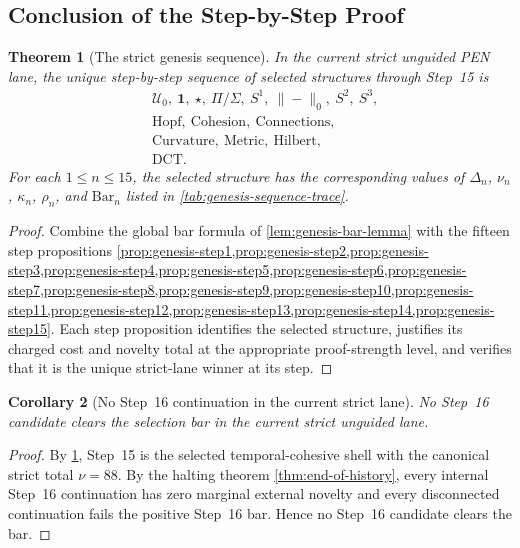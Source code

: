\documentclass[11pt,a4paper]{article}
\theoremstyle{plain}
\newtheorem{theorem}{Theorem}[section]
\newtheorem{corollary}[theorem]{Corollary}
\theoremstyle{definition}
\theoremstyle{remark}
\newcommand{\U}{\mathcal{U}}
\begin{document}
\subsection{Conclusion of the Step-by-Step Proof}
\label{subsec:genesis-proof-conclusion}

\begin{theorem}[The strict genesis sequence]
\label{thm:strict-genesis-sequence}
In the current strict unguided PEN lane, the unique step-by-step sequence of
selected structures through Step~15 is
\[
  \begin{aligned}
    &\U_0,\ \mathbf{1},\ \star,\ \Pi/\Sigma,\ S^1,\ \|{-}\|_0,\ S^2,\ S^3,\\
    &\mathrm{Hopf},\ \mathrm{Cohesion},\ \mathrm{Connections},\\
    &\mathrm{Curvature},\ \mathrm{Metric},\ \mathrm{Hilbert},\\
    &\mathrm{DCT}.
  \end{aligned}
\]
For each $1\le n\le 15$, the selected structure has the corresponding values of
$\Delta_n$, $\nu_n$, $\kappa_n$, $\rho_n$, and $\mathrm{Bar}_n$ listed in
\cref{tab:genesis-sequence-trace}.
\end{theorem}

\begin{proof}
Combine the global bar formula of \cref{lem:genesis-bar-lemma} with the fifteen
step propositions
\cref{prop:genesis-step1,prop:genesis-step2,prop:genesis-step3,prop:genesis-step4,prop:genesis-step5,prop:genesis-step6,prop:genesis-step7,prop:genesis-step8,prop:genesis-step9,prop:genesis-step10,prop:genesis-step11,prop:genesis-step12,prop:genesis-step13,prop:genesis-step14,prop:genesis-step15}.
Each step proposition identifies the selected structure, justifies its charged
cost and novelty total at the appropriate proof-strength level, and verifies
that it is the unique strict-lane winner at its step.
\end{proof}

\begin{corollary}[No Step~16 continuation in the current strict lane]
\label{cor:genesis-no-step16}
No Step~16 candidate clears the selection bar in the current strict unguided
lane.
\end{corollary}

\begin{proof}
By \cref{thm:strict-genesis-sequence}, Step~15 is the selected temporal-cohesive
shell with the canonical strict total $\nu=88$.
By the halting theorem \cref{thm:end-of-history}, every internal Step~16
continuation has zero marginal external novelty and every disconnected
continuation fails the positive Step~16 bar.
Hence no Step~16 candidate clears the bar.
\end{proof}

\let\paragraph\genesissequenceorigparagraph

\ifgenesissequencestandalone
\end{document}
